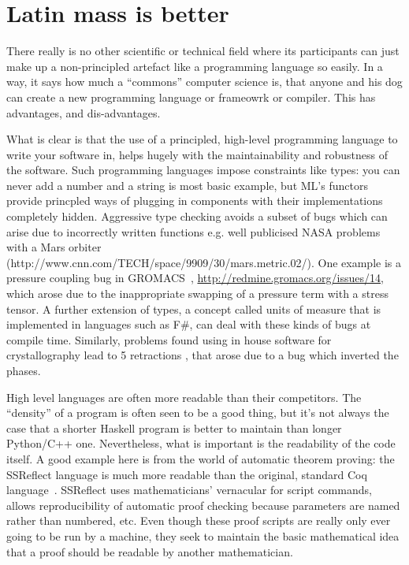 \documentclass[conference]{IEEEtran}
\begin{document}
\section{Latin mass is better}

There really is no other scientific or technical field where its
participants can just make up a non-principled artefact like a
programming language so easily. In a way, it says how much a
``commons'' computer science is, that anyone and his dog can create a
new programming language or frameowrk or compiler. This has
advantages, and dis-advantages.

What is clear is that the use of a principled, high-level programming
language to write your software in, helps hugely with the
maintainability and robustness of the software. Such programming
languages impose constraints like types: you can never add a number
and a string is most basic example, but ML's functors provide
princpled ways of plugging in components with their implementations
completely hidden. Aggressive type checking avoids a subset of bugs
which can arise due to incorrectly written functions e.g. well
publicised NASA problems with a Mars orbiter
(http://www.cnn.com/TECH/space/9909/30/mars.metric.02/).
One example is a pressure coupling bug in GROMACS~\cite{Hess2008},
\url{http://redmine.gromacs.org/issues/14}, which arose due to the
inappropriate swapping of a pressure term with a stress tensor.  A
further extension of types, a concept called units of measure that is
implemented in languages such as F\#, can deal with these kinds of
bugs at compile time.
Similarly, problems found using in house software for crystallography lead to 5
retractions \cite{Miller2006}, that arose due to a bug which inverted
the phases.

High level languages are often more readable than their
competitors. The ``density'' of a program is often seen to be a good
thing, but it's not always the case that a shorter Haskell program is
better to maintain than longer Python/C++ one. Nevertheless, what is
important is the readability of the code itself. A good example here
is from the world of automatic theorem proving: the SSReflect language
is much more readable than the original, standard Coq
language~\cite{GonthierZND13}. SSReflect uses mathematicians'
vernacular for script commands, allows reproducibility of automatic
proof checking because parameters are named rather than numbered,
etc. Even though these proof scripts are really only ever going to be
run by a machine, they seek to maintain the basic mathematical idea
that a proof should be readable by another mathematician.
\end{document}
